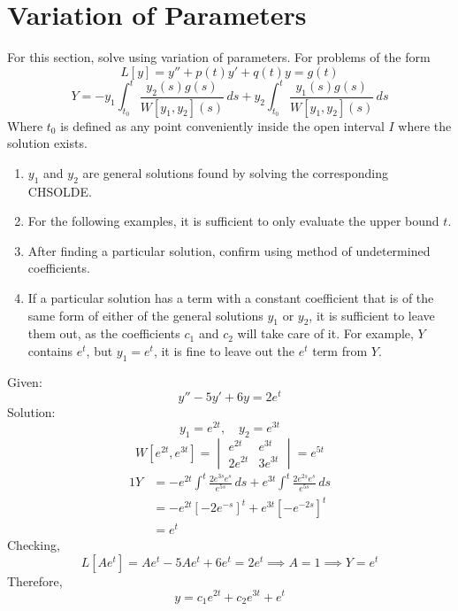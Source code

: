 \documentclass[diffeq.tex]{subfiles}
\begin{document}
\section{Variation of Parameters}
For this section, solve using variation of parameters. For problems of the form
\begin{equation}
    L[y] = y'' + p(t)y' + q(t)y = g(t)
\end{equation}
\begin{equation}
    Y = -y_{1}\int^{t}_{t_{0}}\frac{y_{2}(s) g(s)}{W[y_{1}, y_{2}](s)}\,ds +y_{2}\int^{t}_{t_{0}}\frac{y_{1}(s) g(s)}{W[y_{1}, y_{2}](s)}\,ds
\end{equation}
Where $t_{0}$ is defined as any point conveniently inside the open interval $I$ where the solution exists.
\begin{enumerate}
    \item $y_{1}$ and $y_{2}$ are general solutions found by solving the corresponding CH\-SOLDE.
    \item For the following examples, it is sufficient to only evaluate the upper bound $t$.
    \item After finding a particular solution, confirm using method of undetermined coefficients.
    \item If a particular solution has a term with a constant coefficient that is of the same form of either of the general solutions $y_{1}$ or $y_{2}$, it is sufficient to leave them out, as the coefficients $c_{1}$ and $c_{2}$ will take care of it. For example, $Y$ contains $e^{t}$, but $y_{1} = e^{t}$, it is fine to leave out the $e^{t}$ term from $Y$.
\end{enumerate}
\begin{homework*}[146.1]
    Given:
    \begin{equation}
        y'' - 5y' + 6y = 2e^{t}
    \end{equation}
    Solution:
    \begin{equation}
        y_{1} = e^{2t},\quad y_{2} = e^{3t}
    \end{equation}
    \begin{equation}
        W[e^{2t}, e^{3t}] = \begin{vmatrix}
            e^{2t} & e^{3t} \\
            2e^{2t} & 3e^{3t}
        \end{vmatrix} = e^{5t}
    \end{equation}
    \begin{alignat}{1}
        Y &= -e^{2t}\int^{t}\frac{2e^{3s}e^{s}}{e^{5s}}\,ds + e^{3t}\int^{t}\frac{2e^{2s}e^{s}}{e^{5s}}\,ds\\
        &= -e^{2t}[-2e^{-s}]^{t} + e^{3t}[-e^{-2s}]^{t}\\
        &= e^{t}
    \end{alignat}
    Checking,
    \begin{equation}
        L[Ae^{t}] = Ae^{t} - 5Ae^{t} + 6e^{t} = 2e^{t} \implies A = 1 \implies Y = e^{t}
    \end{equation}
    Therefore,
    \begin{equation}
        y = c_{1}e^{2t} + c_{2}e^{3t} + e^{t}
    \end{equation}
\end{homework*}
\end{document}
